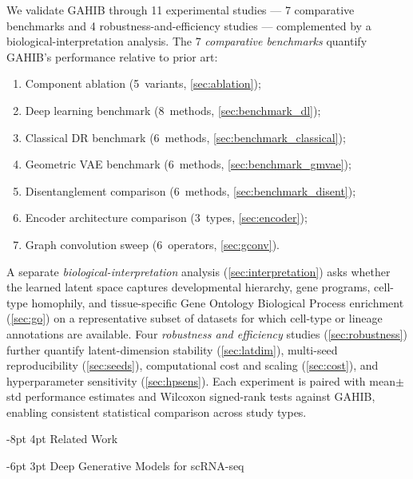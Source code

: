 \documentclass[preprint,12pt]{elsarticle}
\makeatletter
\renewcommand\section{\@startsection{section}{1}{\z@}%
  {-8pt \@plus -2pt \@minus -2pt}%
  {4pt \@plus 1pt \@minus 1pt}%
  {\normalfont\Large\bfseries}}
\renewcommand\subsection{\@startsection{subsection}{2}{\z@}%
  {-6pt \@plus -2pt \@minus -2pt}%
  {3pt \@plus 1pt \@minus 1pt}%
  {\normalfont\large\bfseries}}
\makeatother
\begin{document}
We validate GAHIB through 11 experimental studies --- 7 comparative
benchmarks and 4 robustness-and-efficiency studies --- complemented by
a biological-interpretation analysis. The 7 \emph{comparative
benchmarks} quantify GAHIB's performance relative to prior art:
\begin{enumerate}[leftmargin=*,itemsep=0pt,label=(\roman*)]
\item Component ablation (5~variants, \cref{sec:ablation});
\item Deep learning benchmark (8~methods, \cref{sec:benchmark_dl});
\item Classical DR benchmark (6~methods, \cref{sec:benchmark_classical});
\item Geometric VAE benchmark (6~methods, \cref{sec:benchmark_gmvae});
\item Disentanglement comparison (6~methods, \cref{sec:benchmark_disent});
\item Encoder architecture comparison (3~types, \cref{sec:encoder});
\item Graph convolution sweep (6~operators, \cref{sec:gconv}).
\end{enumerate}
A separate \emph{biological-interpretation} analysis
(\cref{sec:interpretation}) asks whether the learned latent space
captures developmental hierarchy, gene programs, cell-type homophily,
and tissue-specific Gene Ontology Biological Process enrichment
(\cref{sec:go}) on a representative subset of datasets for which
cell-type or lineage annotations are available.
Four \emph{robustness and efficiency} studies
(\cref{sec:robustness}) further quantify latent-dimension stability
(\cref{sec:latdim}), multi-seed reproducibility (\cref{sec:seeds}),
computational cost and scaling (\cref{sec:cost}), and hyperparameter
sensitivity (\cref{sec:hpsens}).
Each experiment is paired with mean$\pm$std performance estimates and
Wilcoxon signed-rank tests against GAHIB, enabling consistent statistical
comparison across study types.


\section{Related Work}\label{sec:related}

\subsection{Deep Generative Models for scRNA-seq}
\end{document}
